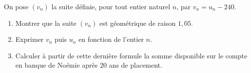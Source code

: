 \medskip

On pose $\left(v_n\right)$ la suite définie, pour tout entier naturel $n$, par $v_n = u_n- 240$.

\begin{enumerate}[resume]
\item Montrer que la suite $\left(v_n\right)$ est géométrique de raison $1,05$.
\item Exprimer $v_n$ puis $u_n$ en fonction de l’entier $n$.
\item Calculer à partir de cette dernière formule la somme disponible sur le compte en banque de
Noémie après 20 ans de placement.
\end{enumerate}

\vspace{0,5cm}
